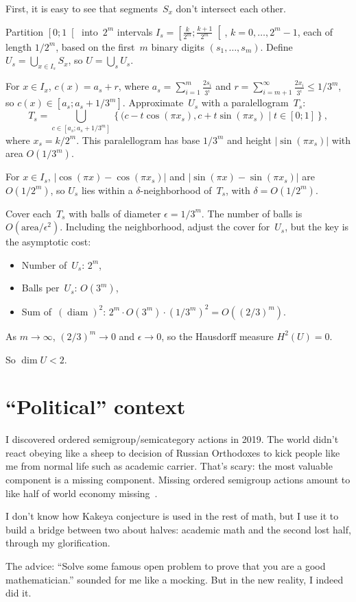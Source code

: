 \documentclass[oneside,draft]{amsart}
\newcommand{\setcond}[2]{\left\{#1\mid#2\right\}}
\newcommand{\diam}{\operatorname{diam}}
\begin{document}
First, it is easy to see that segments~$S_x$ don't intersect each other.

Partition $\left[0;1\right[$ into~$2^m$ intervals $I_s=\left[\frac{k}{2^m};\frac{k+1}{2^m}\right[$, $k=0,\ldots,2^m-1$, each of length $1/2^m$, based on the first~$m$ binary digits $(s_1,\ldots,s_m)$. Define $U_s=\bigcup_{x\in I_s} S_x$, so $U=\bigcup_s U_s$.

For $x\in I_x$, $c(x)=a_s+r$, where $a_s=\sum_{i=1}^m \frac{2s_i}{3^i}$ and $r=\sum_{i=m+1}^\infty \frac{2x_i}{3^i}\leq 1/3^m$, so $c(x)\in[a_s;a_s+1/3^m]$. Approximate~$U_s$ with a paralellogram~$T_s$:
\[
T_s = \bigcup_{c\in[a_s;a_s+1/3^m]} \setcond{(c-t\cos(\pi x_s), c+t\sin(\pi x_s)}{t\in[0;1]},
\]
where $x_s=k/2^m$. This paralellogram has base $1/3^m$ and height $\lvert\sin(\pi x_s)\rvert$ with area $O(1/3^m)$.

For $x\in I_s$, $\lvert\cos(\pi x)-\cos(\pi x_s)\rvert$ and $\lvert\sin(\pi x)-\sin(\pi x_s)\rvert$ are $O(1/2^m)$, so $U_s$ lies within a $\delta$-neigh\-bor\-hood of~$T_s$, with $\delta=O(1/2^m)$.

Cover each~$T_s$ with balls of diameter $\epsilon=1/3^m$. The number of balls is $O(\mathrm{area}/\epsilon^2)$. Including the neighborhood, adjust the cover for~$U_s$, but the key is the asymptotic cost:

\begin{itemize}
\item Number of~$U_s$: $2^m$,
\item Balls per~$U_s$: $O(3^m)$,
\item Sum of~$(\diam)^2$: $2^m\cdot O(3^m)\cdot(1/3^m)^2=O((2/3)^m)$.
\end{itemize}

As $m\to\infty$, $(2/3)^m\to 0$ and $\epsilon\to 0$, so the Hausdorff measure $H^2(U)=0$.

So $\dim U<2$.

\section{``Political'' context}

I discovered ordered semigroup/semicategory actions in 2019. The world didn't react obeying like a sheep to decision of Russian Orthodoxes to kick people like me from normal life such as academic carrier. That's scary: the most valuable component is a missing component. Missing ordered semigroup actions amount to like half of world economy missing~\cite{osa-important}.

I don't know how Kakeya conjecture is used in the rest of math, but I use it to build a bridge between two about halves: academic math and the second lost half, through my glorification.

The advice: ``Solve some famous open problem to prove that you are a good mathematician.'' sounded for me like a mocking. But in the new reality, I indeed did it.



\end{document}

